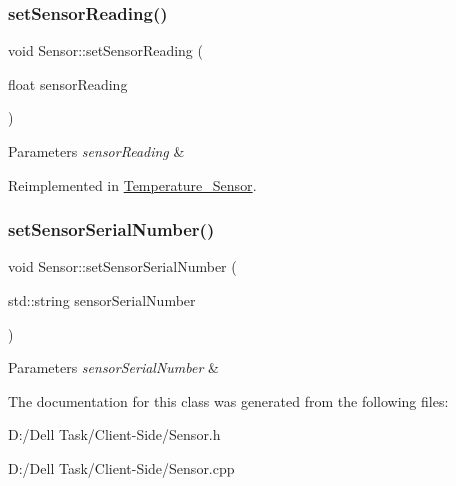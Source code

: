 \subsubsection{\texorpdfstring{set\+Sensor\+Reading()}{setSensorReading()}}
{\footnotesize\ttfamily void Sensor\+::set\+Sensor\+Reading (\begin{DoxyParamCaption}\item[{float}]{sensor\+Reading }\end{DoxyParamCaption})\hspace{0.3cm}{\ttfamily [virtual]}}






\begin{DoxyParams}{Parameters}
{\em sensor\+Reading} & \\
\hline
\end{DoxyParams}


Reimplemented in \mbox{\hyperlink{class_temperature___sensor_a9dcb003cce1faf22a5a22071ca95b2b4}{Temperature\+\_\+\+Sensor}}.

\mbox{\label{class_sensor_a59ad3f638a81e29a9fac3526be948ce5}} 
\subsubsection{\texorpdfstring{set\+Sensor\+Serial\+Number()}{setSensorSerialNumber()}}
{\footnotesize\ttfamily void Sensor\+::set\+Sensor\+Serial\+Number (\begin{DoxyParamCaption}\item[{std\+::string}]{sensor\+Serial\+Number }\end{DoxyParamCaption})}






\begin{DoxyParams}{Parameters}
{\em sensor\+Serial\+Number} & \\
\hline
\end{DoxyParams}


The documentation for this class was generated from the following files\+:\begin{DoxyCompactItemize}
\item 
D\+:/\+Dell Task/\+Client-\/\+Side/Sensor.\+h\item 
D\+:/\+Dell Task/\+Client-\/\+Side/Sensor.\+cpp\end{DoxyCompactItemize}
